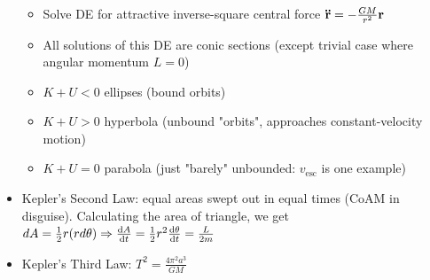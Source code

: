 \documentclass[10pt,landscape]{article}
\begin{document}
\begin{multicols*}{4}
\begin{itemize}
\begin{itemize}
        \item Solve DE for attractive inverse-square central force $\vb{\ddot{r}} = -\frac{GM}{r^2}\vb{r}$
        \item All solutions of this DE are conic sections (except trivial case where angular momentum $L = 0$)
        \item $K + U < 0$ ellipses (bound orbits)
        \item $K + U > 0$ hyperbola (unbound "orbits", approaches constant-velocity motion)
        \item $K + U = 0$ parabola (just "barely" unbounded: $v_{\text{esc}}$ is one example)
    \end{itemize}
    \item Kepler's Second Law: equal areas swept out in equal times (CoAM in disguise). Calculating the area of triangle, we get $dA = \frac{1}{2}r(rd\theta) \Rightarrow \dv{A}{t} = \frac{1}{2}r^2\dv{\theta}{t} = \frac{L}{2m}$
    \item Kepler's Third Law: $T^2 = \frac{4\pi^2a^3}{GM}$
\end{itemize}

\end{multicols*}
\end{document}
